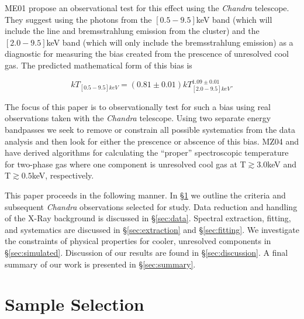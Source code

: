 \documentclass[12pt, preprint]{aastex}
\begin{document}
ME01 propose an observational test for this effect using the
{\textit{Chandra}} telescope. They suggest using the photons from the
$[0.5-9.5]$keV band (which will include the line and bremsstrahlung
emission from the cluster) and the $[2.0-9.5]$keV band (which will only
include the bremsstrahlung emission) as a diagnostic for measuring the
bias created from the prescence of unresolved cool gas. The predicted
mathematical form of this bias is

\begin{equation}
kT_{[0.5-9.5]keV} = (0.81\pm0.01)kT_{[2.0-9.5]keV}^{1.09\pm0.01}.
\end{equation}

The focus of this paper is to observationally test for such a bias
using real observations taken with the {\textit{Chandra}} telescope.
Using two separate energy bandpasses we seek to remove or
constrain all possible systematics from the data analysis and
then look for either the prescence or abscence of this bias. MZ04
and \cite{2006ApJ...640..710V} have derived algorithms for calculating
the ``proper'' spectroscopic temperature for two-phase gas where one
component is unresolved cool gas at T$\gtrsim 3.0$keV and T$\gtrsim
0.5$keV, respectively.


This paper proceeds in the following manner. In \S\ref{sec:selection}
we outline the criteria and subsequent {\textit{Chandra}} observations selected for
study. Data reduction and handling of the X-Ray background is
discussed in \S\ref{sec:data}. Spectral extraction, fitting, and systematics are
discussed in \S\ref{sec:extraction} and \S\ref{sec:fitting}. We investigate the constraints of physical
properties for cooler, unresolved components in
\S\ref{sec:simulated}. Discussion of our results are found in
\S\ref{sec:discussion}. A final summary of our work is
presented in \S\ref{sec:summary}.

\section{Sample Selection} \label{sec:selection}

\end{document}

